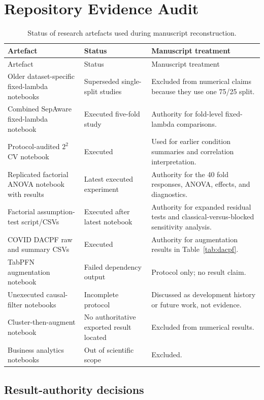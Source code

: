 \chapter{Repository Evidence Audit}
\label{app:audit}

\begin{longtable}{>{\raggedright\arraybackslash}p{}>{\raggedright\arraybackslash}p{}>{\raggedright\arraybackslash}p{}}
\caption{Status of research artefacts used during manuscript reconstruction.}\label{tab:audit}\\
\toprule
Artefact & Status & Manuscript treatment\\
\midrule
\endfirsthead
\toprule
Artefact & Status & Manuscript treatment\\
\midrule
\endhead
Older dataset-specific fixed-lambda notebooks & Superseded single-split studies & Excluded from numerical claims because they use one 75/25 split.\\
Combined SepAware fixed-lambda notebook & Executed five-fold study & Authority for fold-level fixed-lambda comparisons.\\
Protocol-audited $2^2$ CV notebook & Executed & Used for earlier condition summaries and correlation interpretation.\\
Replicated factorial ANOVA notebook with results & Latest executed experiment & Authority for the 40 fold responses, ANOVA, effects, and diagnostics.\\
Factorial assumption-test script/CSVs & Executed after latest notebook & Authority for expanded residual tests and classical-versus-blocked sensitivity analysis.\\
COVID DACPF raw and summary CSVs & Executed & Authority for augmentation results in Table~\ref{tab:dacpf}.\\
TabPFN augmentation notebook & Failed dependency output & Protocol only; no result claim.\\
Unexecuted causal-filter notebooks & Incomplete protocol & Discussed as development history or future work, not evidence.\\
Cluster-then-augment notebook & No authoritative exported result located & Excluded from numerical results.\\
Business analytics notebooks & Out of scientific scope & Excluded.\\
\bottomrule
\end{longtable}

\section{Result-authority decisions}

